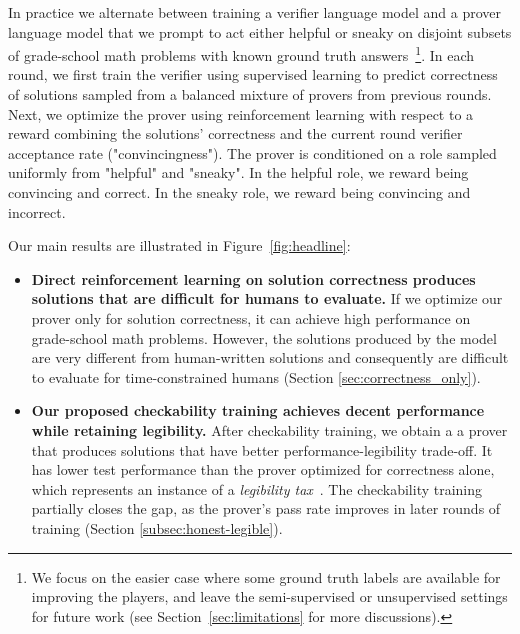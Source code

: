 \documentclass{article}
\begin{document}
In practice we alternate between training a verifier language model and a prover language model that we prompt to act either helpful or sneaky on disjoint subsets of grade-school math problems with known ground truth answers~\citep{cobbe2021training}\footnote{We focus on the easier case where some ground truth labels are available for improving the players, and leave the semi-supervised or unsupervised settings for future work (see Section~\ref{sec:limitations} for more discussions).}. In each round, we first train the verifier using supervised learning to predict correctness of solutions sampled from a balanced mixture of provers from previous rounds. Next, we optimize the prover using reinforcement learning with respect to a reward combining the solutions' correctness and the current round verifier acceptance rate ("convincingness"). The prover is conditioned on a role sampled uniformly from "helpful" and "sneaky". In the helpful role, we reward being convincing and correct. In the sneaky role, we reward being convincing and incorrect.

Our main results are illustrated in Figure~\ref{fig:headline}:

\begin{itemize}
    \item \textbf{Direct reinforcement learning on solution correctness produces solutions that are difficult for humans to evaluate.} If we optimize our prover only for solution correctness, it can achieve high performance on grade-school math problems. However, the solutions produced by the model are very different from human-written solutions and consequently are difficult to evaluate for time-constrained humans (Section \ref{sec:correctness_only}).
    \item \textbf{Our proposed checkability training achieves decent performance while retaining legibility.}
After checkability training, we obtain a a prover that produces solutions that have better performance-legibility trade-off. It has lower test performance than the prover optimized for correctness alone, which represents an instance of a {\em legibility tax}~\citep{leike2022distinguishing}. The checkability training partially closes the gap, as the prover's pass rate improves in later rounds of training (Section \ref{subsec:honest-legible}).

\end{itemize}
\end{document}
